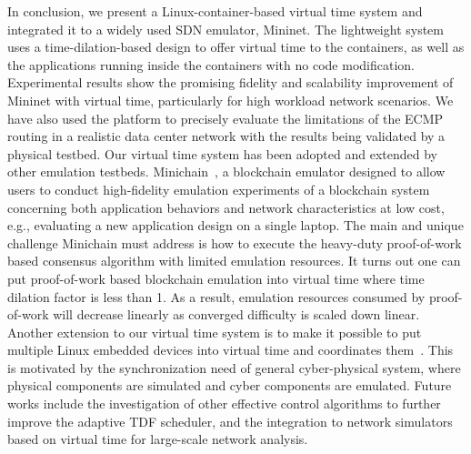 \label{VT:Sec:Conclusion}

In conclusion, we present a Linux-container-based virtual time system and integrated it to a widely used SDN emulator, Mininet.
The lightweight system uses a time-dilation-based design to offer virtual time to the containers,
as well as the applications running inside the containers with no code modification.
Experimental results show the promising fidelity and scalability improvement of Mininet with virtual time,
particularly for high workload network scenarios. We have also used the platform to precisely
evaluate the limitations of the ECMP routing in a realistic data center network with the results being validated by a physical testbed.
Our virtual time system has been adopted and extended by other emulation testbeds.
Minichain~\cite{Minichain}, a blockchain emulator designed to allow users to conduct
high-fidelity emulation experiments of a blockchain system concerning both application behaviors
and network characteristics at low cost, e.g., evaluating a new application design on a single laptop.
The main and unique challenge Minichain must address is how to execute
the heavy-duty proof-of-work based consensus algorithm with limited emulation resources.
It turns out one can put proof-of-work based blockchain emulation into virtual time where time dilation factor is less than 1.
As a result, emulation resources consumed by proof-of-work will decrease linearly as converged difficulty is scaled down linear.
Another extension to our virtual time system is to make it possible to put
multiple Linux embedded devices into virtual time and coordinates them~\cite{DistributedVT}.
This is motivated by the synchronization need of general cyber-physical system,
where physical components are simulated and cyber components are emulated.
Future works include the investigation of other effective control algorithms to further improve the adaptive TDF scheduler,
and the integration to network simulators based on virtual time for large-scale network analysis.

